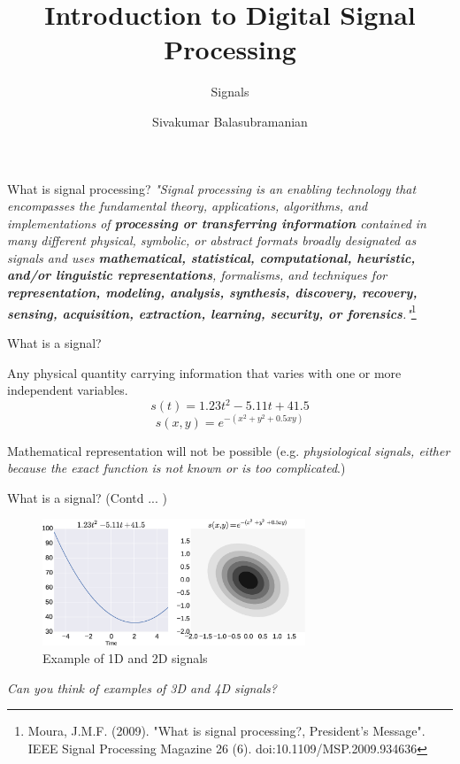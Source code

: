 \documentclass[aspectratio=169]{beamer}
\title{Introduction to Digital Signal Processing}
\subtitle{Signals}
\author{Sivakumar Balasubramanian}
\institute[Christian Medical College] %
{
  \inst{}%
  Department of Bioengineering\\
  Christian Medical College, Bagayam\\
  Vellore 632002
}
\date{}
\begin{document}
\begin{frame}
  \titlepage
\end{frame}

\begin{frame}{What is signal processing?}
\textit{
"Signal processing is an enabling technology that encompasses the fundamental theory, applications, algorithms, and implementations of \textbf{processing or transferring information} contained in many different physical, symbolic, or abstract formats broadly designated as signals and uses \textbf{mathematical, statistical, computational, heuristic, and/or linguistic representations}, formalisms, and techniques for \textbf{representation, modeling, analysis, synthesis, discovery, recovery, sensing, acquisition, extraction, learning, security, or forensics}."}\footnote{\tiny{Moura, J.M.F. (2009). "What is signal processing?, President’s Message". IEEE Signal Processing Magazine 26 (6). doi:10.1109/MSP.2009.934636}}
\end{frame}

\begin{frame}{What is a signal?}

Any physical quantity carrying information that varies with one or more independent variables.
$$ s\left(t\right) = 1.23t^2 - 5.11t +41.5 $$
$$ s\left(x,y\right) = e^{-(x^2 + y^2 + 0.5xy)} $$

Mathematical representation will not be possible (e.g. \textit{physiological signals,  either because the exact function is not known or is too complicated}.)
\end{frame}

\begin{frame}[t]
\end{frame}

\begin{frame}{What is a signal? (Contd ... )}

\begin{figure}
\includegraphics[width=0.7\textwidth]{img/signals.eps}
\caption{Example of 1D and 2D signals}
\end{figure}

\textit{Can you think of examples of 3D and 4D signals?}
\end{frame}
\end{document}
